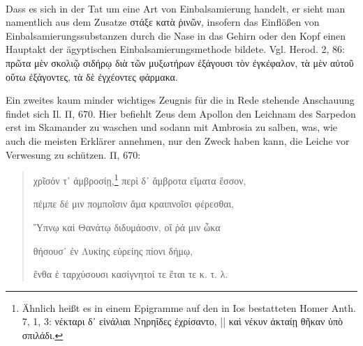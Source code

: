 \documentclass[a4paper, 11pt, oneside]{article}
\begin{document}
\paragraph{}
Dass es sich in der Tat um eine Art von Einbalsamierung handelt, er sieht man namentlich aus dem Zusatze στάξε κατὰ ῥινῶν, insofern das Einflößen von Einbalsamierungssubstanzen durch die Nase in das Gehirn oder den Kopf einen Hauptakt der ägyptischen Einbalsamierungsmethode bildete. Vgl. Herod. 2, 86: πρῶτα μὲν σκολιῷ σιδήρῳ διὰ τῶν μυξωτήρων ἐξάγουσι τὸν ἐγκέφαλον, τὰ μὲν αὐτοῦ οὕτω ἐξάγοντες, τὰ δὲ ἐγχέοντες φάρμακα.

Ein zweites kaum minder wichtiges Zeugnis für die in Rede stehende Anschauung findet sich Il. Π, 670. Hier befiehlt Zeus dem Apollon den Leichnam des Sarpedon erst im Skamander zu waschen und sodann mit Ambrosia zu salben, was, wie auch die meisten Erklärer annehmen, nur den Zweck haben kann, die Leiche vor Verwesung zu schützen. Π, 670:
\begin{quotation}\large
χρῖσόν τ᾿ ἀμβροσίῃ,\footnote{Ähnlich heißt es in einem Epigramme auf den in Ios bestatteten Homer Anth. 7, 1, 3: νέκταρι δ᾽ εἰνάλιαι Νηρηΐδες ἐχρίσαντο, || καὶ νέκυν ἀκταίῃ θῆκαν ὑπὸ σπιλάδι.} περὶ δ᾽ ἄμβροτα εἴματα ἕσσον,

πέμπε δέ μιν πομποῖσιν ἅμα κραιπνοῖσι φέρεσθαι,

Ὕπνῳ καὶ Θανάτῳ διδυμάοσιν, οἵ ῥά μιν ὦκα

θήσουσ᾽ ἐν Λυκίης εὐρείης πίονι δήμῳ,

ἔνθα ἑ ταρχύσουσι κασίγνητοί τε ἔται τε κ. τ. λ.
\end{quotation}
\end{document}
